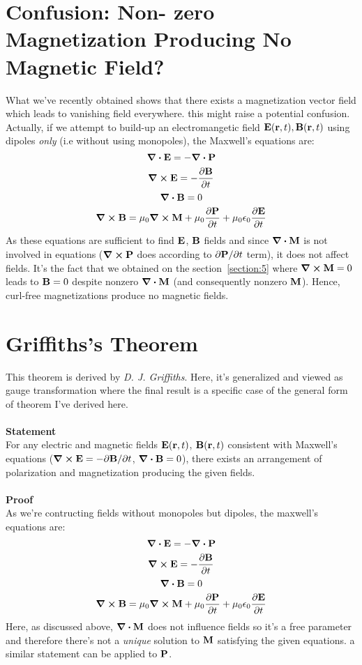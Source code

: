 \documentclass{article}
\numberwithin{equation}{section}
\begin{document}
\section{Confusion: Non-
zero Magnetization Producing No Magnetic Field?}
What we've recently obtained shows that there exists a magnetization vector field which leads to vanishing field everywhere. this might raise a potential confusion. Actually, if we attempt to build-up an electromangetic field $\vb{E}(\vb{r},t) , \vb{B}(\vb{r},t)$ using dipoles \textit{only} (i.e without using monopoles), the Maxwell's equations are:
$$\div\vb{E}=-\div\vb{P}$$
$$\curl\vb{E}=-\frac{\partial\vb{B}}{\partial t}$$
$$\div\vb{B}=0$$
$$\curl\vb{B}=\mu_0\curl\vb{M}+\mu_0\frac{\partial\vb{P}}{\partial t}+\mu_0\epsilon_0\frac{\partial\vb{E}}{\partial t}$$
As these equations are sufficient to find $\vb{E}$, $\vb{B}$ fields and since $\div\vb{M}$ is not involved in equations ($\curl\vb{P}$ does according to $\partial\vb{P}/\partial t$ term), it does not affect fields. It's the fact that we obtained on the section~\ref{section:5} where $\curl\vb{M}=0$ leads to $\vb{B}=0$ despite nonzero $\div\vb{M}$ (and consequently nonzero $\vb{M}$). Hence, curl-free magnetizations produce no magnetic fields.

\section{Griffiths's Theorem}
This theorem is derived by \textit{D. J. Griffiths}. Here, it's generalized and viewed as gauge transformation where the final result is a specific case of the general form of theorem I've derived here.
\\\\
\textbf{Statement}\\ For any electric and magnetic fields $\vb{E}(\vb{r},t)$, $\vb{B}(\vb{r},t)$ consistent with Maxwell's equations ($\curl\vb{E}=-\partial\vb{B}/\partial t$, $\div\vb{B}=0$), there exists an arrangement of polarization and magnetization producing the given fields.\cite{book:91141798}\\\\
\textbf{Proof}\\ As we're contructing fields without monopoles but dipoles, the maxwell's equations are:
$$\div\vb{E}=-\div\vb{P}$$ $$\curl\vb{E}=-\frac{\partial\vb{B}}{\partial t}$$ $$\div\vb{B}=0$$ $$\curl\vb{B}=\mu_0\curl\vb{M}+\mu_0\frac{\partial\vb{P}}{\partial t}+\mu_0\epsilon_0\frac{\partial\vb{E}}{\partial t}$$
Here, as discussed above, $\div\vb{M}$ does not influence fields so it's a free parameter and therefore there's not a \textit{unique} solution to $\vb{M}$ satisfying the given equations. a similar statement can be applied to $\vb{P}$. 
\end{document}
